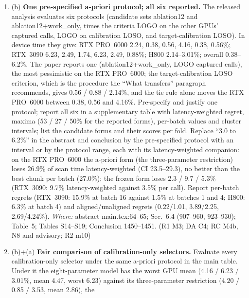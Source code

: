 \documentclass[11pt]{article}
\begin{document}
\begin{enumerate}[label=M4\alph*.]
  \item (b) \textbf{One pre-specified a-priori protocol; all six reported.}
        The released analysis evaluates six protocols (candidate sets
        ablation12 and ablation12+work\_only, times the criteria LOGO on the
        other GPUs' captured calls, LOGO on calibration LOSO, and
        target-calibration LOSO). In device time they give: RTX PRO~6000
        2.24, 0.38, 0.56, 4.16, 0.38, 0.56\%; RTX~3090 6.23, 2.49, 1.74, 6.23,
        2.49, 0.88\%; H800 2.14--3.01\%; overall 0.38--6.2\%. The paper
        reports one (ablation12+work\_only, LOGO captured calls), the most
        pessimistic on the RTX PRO~6000; the target-calibration LOSO
        criterion, which is the procedure the ``What transfers'' paragraph
        recommends, gives 0.56 / 0.88 / 2.14\%, and the tie rule alone moves
        the RTX PRO~6000 between 0.38, 0.56 and 4.16\%. Pre-specify and
        justify one protocol; report all six in a supplementary table with
        latency-weighted regret, maxima (53 / 27 / 50\% for the reported
        forms), per-batch values and cluster intervals; list the candidate
        forms and their scores per fold. Replace ``3.0 to 6.2\%'' in the
        abstract and conclusion by the pre-specified protocol with an interval
        or by the protocol range, each with its latency-weighted companion: on
        the RTX PRO~6000 the a-priori form (the three-parameter restriction)
        loses 26.9\% of scan time latency-weighted (CI 23.5--29.3), no better
        than the best chunk per batch (27.0\%); the frozen form loses 2.3 /
        9.7 / 5.3\% (RTX~3090: 9.7\% latency-weighted against 3.5\% per call).
        Report per-batch regrets (RTX~3090: 15.9\% at batch 16 against 1.5\%
        at batches 1 and 4; H800: 6.3\% at batch 4) and aligned/unaligned
        regrets (0.22/1.01, 3.89/2.25, 2.69/4.24\%). \emph{Where:} abstract
        main.tex:64--65; Sec.~6.4 (907--960, 923--930); Table~5; Tables
        S14--S19; Conclusion 1450--1451. (R1 M3; DA C4; RC M4b, N8 and
        advisory; R2 m10)
  \item (b)+(a) \textbf{Fair comparison of calibration-only selectors.}
        Evaluate every calibration-only selector under the same a-priori
        protocol in the main table. Under it the eight-parameter model has the
        worst GPU mean (4.16 / 6.23 / 3.01\%, mean 4.47, worst 6.23) against
        its three-parameter restriction (4.20 / 0.85 / 3.53, mean 2.86), the

\end{enumerate}
\end{document}
